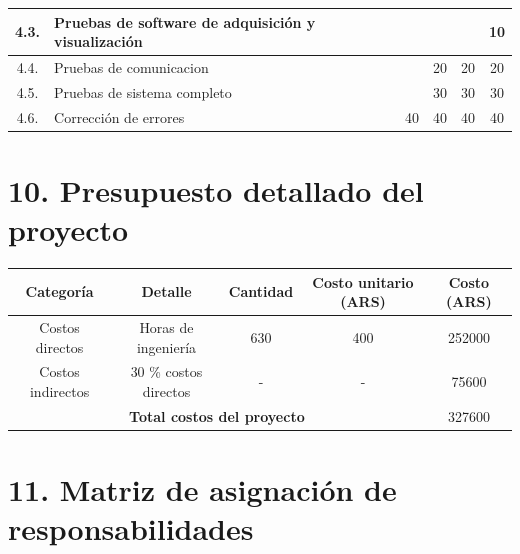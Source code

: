 \documentclass[11pt]{charter}
\begin{document}
\begin{table}[htbp]
\begin{tabularx}{\linewidth}{|c|X|c|c|c|c|}
4.3.                                                                                           & Pruebas de software de adquisición y visualización                                                  &          &                           &               & 10                \\ \hline
4.4.                                                                                           & Pruebas de comunicacion                                                                             &          & 20                        & 20            & 20                \\ \hline
4.5.                                                                                           & Pruebas de sistema completo                                                                         &          & 30                        & 30            & 30                \\ \hline
4.6.                                                                                           & Corrección de errores                                                                               & 40       & 40                        & 40            & 40                \\ \hline
\end{tabularx}
\end{table}


\section{10. Presupuesto detallado del proyecto}
\label{sec:presupuesto}

\begin{table}[htbp]
\begin{tabular}{|c|c|c|c|c|}
\hline
\rowcolor[HTML]{C0C0C0} 
Categoría         & Detalle               & Cantidad & Costo unitario (ARS) & Costo (ARS) \\ \hline
Costos directos   & Horas de ingeniería   & 630      & 400                  & 252000      \\ \hline
Costos indirectos & 30 \% costos directos & -        & -                    & 75600       \\ \hline
\multicolumn{4}{|c|}{\textbf{Total costos del proyecto}}                    & 327600     \\ \hline
\end{tabular}
\end{table}

\section{11. Matriz de asignación de responsabilidades}
\label{sec:responsabilidades}
\end{document}

